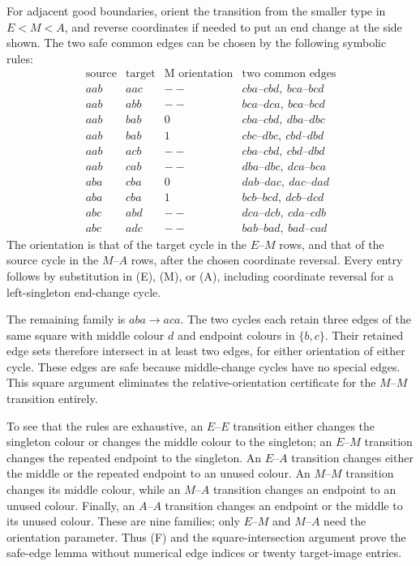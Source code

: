 For adjacent good boundaries, orient the transition from the smaller
type in $E<M<A$, and reverse coordinates if needed to put an end
change at the side shown. The two safe common edges can be chosen
by the following symbolic rules:
\[
\begin{array}{c|c|c|l}
\text{source}&\text{target}&\text{M orientation}&\text{two common edges}\\\hline
aab&aac&--&cba\!\text{--}\!cbd,\ bca\!\text{--}\!bcd\\
aab&abb&--&bca\!\text{--}\!dca,\ bca\!\text{--}\!bcd\\
aab&bab&0&cba\!\text{--}\!cbd,\ dba\!\text{--}\!dbc\\
aab&bab&1&cbc\!\text{--}\!dbc,\ cbd\!\text{--}\!dbd\\
aab&acb&--&cba\!\text{--}\!cbd,\ cbd\!\text{--}\!dbd\\
aab&cab&--&dba\!\text{--}\!dbc,\ dca\!\text{--}\!bca\\
aba&cba&0&dab\!\text{--}\!dac,\ dac\!\text{--}\!dad\\
aba&cba&1&bcb\!\text{--}\!bcd,\ dcb\!\text{--}\!dcd\\
abc&abd&--&dca\!\text{--}\!dcb,\ cda\!\text{--}\!cdb\\
abc&adc&--&bab\!\text{--}\!bad,\ bad\!\text{--}\!cad
\end{array}
\tag{F}
\]
The orientation is that of the target cycle in the $E$--$M$ rows,
and that of the source cycle in the $M$--$A$ rows, after the chosen
coordinate reversal. Every entry follows by substitution in (E),
(M), or (A), including coordinate reversal for a left-singleton
end-change cycle.

The remaining family is $aba\to aca$. The two cycles each retain
three edges of the same square with middle colour $d$ and endpoint
colours in $\{b,c\}$. Their retained edge sets therefore intersect
in at least two edges, for either orientation of either cycle.
These edges are safe because middle-change cycles have no special
edges. This square argument eliminates the relative-orientation
certificate for the $M$--$M$ transition entirely.

To see that the rules are exhaustive, an $E$--$E$ transition either
changes the singleton colour or changes the middle colour to the
singleton; an $E$--$M$ transition changes the repeated endpoint to
the singleton. An $E$--$A$ transition changes either the middle or
the repeated endpoint to an unused colour. An $M$--$M$ transition
changes its middle colour, while an $M$--$A$ transition changes an
endpoint to an unused colour. Finally, an $A$--$A$ transition changes
an endpoint or the middle to its unused colour. These are nine
families; only $E$--$M$ and $M$--$A$ need the orientation parameter.
Thus (F) and the square-intersection argument prove the safe-edge
lemma without numerical edge indices or twenty target-image entries.

